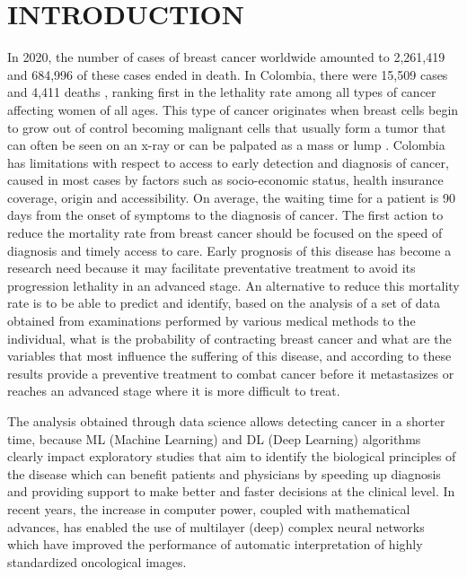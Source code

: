\section{INTRODUCTION}

In 2020, the number of cases of breast cancer worldwide amounted to 2,261,419 and 684,996 of these cases ended in death. In Colombia, there were 15,509 cases and 4,411 deaths \cite{InternationalAgencyforResearchonCancer2020}, ranking first in the lethality rate among all types of cancer affecting women of all ages. This type of cancer originates when breast cells begin to grow out of control becoming malignant cells that usually form a tumor that can often be seen on an x-ray or can be palpated as a mass or lump \cite{Sauer2019}. Colombia has limitations with respect to access to early detection and diagnosis of cancer, caused in most cases by factors such as socio-economic status, health insurance coverage, origin and accessibility. On average, the waiting time for a patient is 90 days from the onset of symptoms to the diagnosis of cancer. The first action to reduce the mortality rate from breast cancer should be focused on the speed of diagnosis and timely access to care\cite{Duarte2021}. Early prognosis of this disease has become a research need because it may facilitate preventative treatment to avoid its progression lethality in an advanced stage. An alternative to reduce this mortality rate is to be able to predict and identify, based on the analysis of a set of data obtained from examinations performed by various medical methods to the individual, what is the probability of contracting breast cancer and what are the variables that most influence the suffering of this disease, and according to these results provide a preventive treatment to combat cancer before it metastasizes or reaches an advanced stage where it is more difficult to treat.

The analysis obtained through data science allows detecting cancer in a shorter time, because ML (Machine Learning) and DL (Deep Learning) algorithms clearly impact exploratory studies that aim to identify the biological principles of the disease which can benefit patients and physicians by speeding up diagnosis and providing support to make better and faster decisions at the clinical level\cite{Turin2020}. In recent years, the increase in computer power, coupled with mathematical advances, has enabled the use of multilayer (deep) complex neural networks which have improved the performance of automatic interpretation of highly standardized oncological images\cite{Mann2020}.

